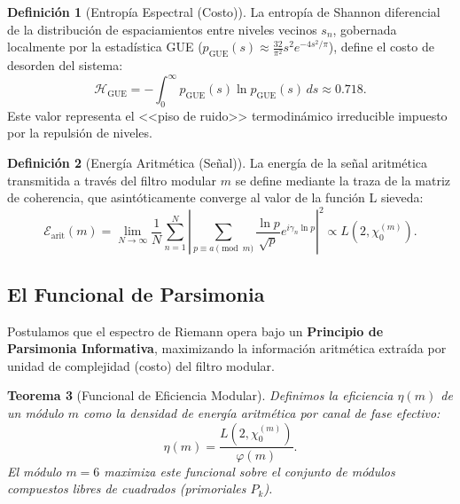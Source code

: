 \documentclass[12pt, a4paper]{article}
\theoremstyle{plain}
\newtheorem{teorema}{Teorema}[section]
\theoremstyle{definition}
\newtheorem{definicion}[teorema]{Definición}
\theoremstyle{remark}
\begin{document}
\begin{definicion}[Entropía Espectral (Costo)]
La entropía de Shannon diferencial de la distribución de espaciamientos entre niveles vecinos $s_n$, gobernada localmente por la estadística GUE ($p_{\text{GUE}}(s) \approx \frac{32}{\pi^2}s^2 e^{-4s^2/\pi}$), define el costo de desorden del sistema:
\[
\mathcal{H}_{\text{GUE}} = - \int_0^\infty p_{\text{GUE}}(s) \ln p_{\text{GUE}}(s) \, ds \approx 0.718.
\]
Este valor representa el <<piso de ruido>> termodinámico irreducible impuesto por la repulsión de niveles.
\end{definicion}

\begin{definicion}[Energía Aritmética (Señal)]
La energía de la señal aritmética transmitida a través del filtro modular $m$ se define mediante la traza de la matriz de coherencia, que asintóticamente converge al valor de la función L sieveda:
\[
\mathcal{E}_{\text{arit}}(m) = \lim_{N \to \infty} \frac{1}{N} \sum_{n=1}^N \left| \sum_{p \equiv a \pmod m} \frac{\ln p}{\sqrt{p}} e^{i\gamma_n \ln p} \right|^2 \propto L(2, \chi_0^{(m)}).
\]
\end{definicion}

\subsection{El Funcional de Parsimonia}

Postulamos que el espectro de Riemann opera bajo un \textbf{Principio de Parsimonia Informativa}, maximizando la información aritmética extraída por unidad de complejidad (costo) del filtro modular.

\begin{teorema}[Funcional de Eficiencia Modular]
Definimos la eficiencia $\eta(m)$ de un módulo $m$ como la densidad de energía aritmética por canal de fase efectivo:
\[
\eta(m) = \frac{L(2, \chi_0^{(m)})}{\varphi(m)}.
\]
El módulo $m=6$ maximiza este funcional sobre el conjunto de módulos compuestos libres de cuadrados (primoriales $P_k$).
\end{teorema}
\end{document}
